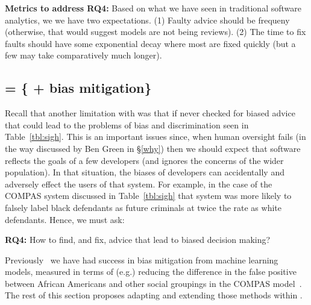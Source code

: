  {\bf Metrics to address RQ4:} Based on what we have seen in traditional software analytics,
 we 
 we have two expectations. (1) Faulty advice should be frequeny (otherwise, that would suggest models are not being reviews).
 (2) The time to fix faults should have some exponential decay   where most   are fixed quickly (but a few may take comparatively much longer).
 
 
\subsection{ = \{ +  bias mitigation\}}
Recall that another limitation with   was that
if never checked for biased advice that 
could lead to the problems of bias and discrimination seen in Table~\ref{tbl:sigh}. 
This is an important issues since, when
    human oversight fails (in the way  discussed by Ben Green in
  \S\ref{why}) then we should
 expect that   software reflects the goals of a few developers (and ignores the concerns of  the wider population).
In that situation, the biases of developers can accidentally and adversely effect the users of that system.  For example, 
 in the case of the COMPAS system discussed in Table~\ref{tbl:sigh} 
 that system was   more likely to falsely label black defendants as future criminals at twice the rate as white defendants.
Hence, we must ask:


\begin{formal}
{\bf RQ4:} How to find, and fix, advice that lead to biased decision making?
\end{formal}



 
 Previously~\cite{Chakraborty_2020,fse21} we have had   success in bias  mitigation
 from machine learning models, measured
 in terms of  (e.g.) reducing the 
  difference in the false positive between African Americans and other social groupings in
 the COMPAS model~\cite{Machine_Bias}. The rest of this section proposes
 adapting and extending those methods within .
 
